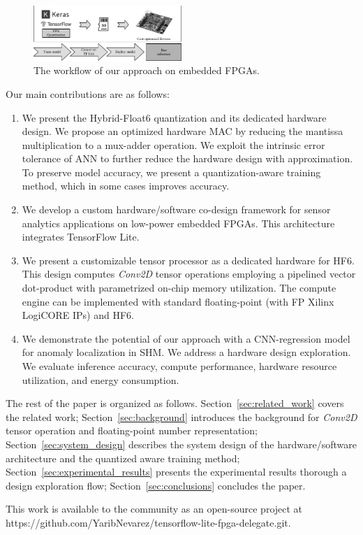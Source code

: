 \begin{figure}[t!]
	\centering
	\includegraphics[width=0.5\textwidth]{../figures/workflow.pdf}
	\caption{The workflow of our approach on embedded FPGAs.}
	\label{fig:workflow}
\end{figure}

Our main contributions are as follows:
\begin{enumerate}
	\item
	
	We present the Hybrid-Float6 quantization and its dedicated hardware design. We propose an optimized hardware MAC by reducing the mantissa multiplication to a mux-adder operation. We exploit the intrinsic error tolerance of ANN to further reduce the hardware design with approximation. To preserve model accuracy, we present a quantization-aware training method, which in some cases improves accuracy.
	
	\item We develop a custom hardware/software co-design framework for sensor analytics applications on low-power embedded FPGAs. This architecture integrates TensorFlow Lite.
	\item We present a customizable tensor processor as a dedicated hardware for HF6. This design computes \emph{Conv2D} tensor operations employing a pipelined vector dot-product with parametrized on-chip memory utilization. The compute engine can be implemented with standard floating-point (with FP Xilinx LogiCORE IPs) and HF6.
	\item We demonstrate the potential of our approach with a CNN-regression model for anomaly localization in SHM. We address a hardware design exploration. We evaluate inference accuracy, compute performance, hardware resource utilization, and energy consumption.
\end{enumerate}

The rest of the paper is organized as follows. Section~\ref{sec:related_work} covers the related work; Section~\ref{sec:background} introduces the background for \emph{Conv2D} tensor operation and floating-point number representation; Section~\ref{sec:system_design} describes the system design of the hardware/software architecture and the quantized aware training method; Section~\ref{sec:experimental_results} presents the experimental results thorough a design exploration flow; Section~\ref{sec:conclusions} concludes the paper.

This work is available to the community as an open-source project at https://github.com/YaribNevarez/tensorflow-lite-fpga-delegate.git.